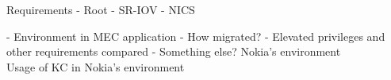 Requirements
- Root
- SR-IOV
- NICS

- Environment in MEC application
    - How migrated?
    - Elevated privileges and other requirements compared
    - Something else?
Nokia's environment \\
Usage of KC in Nokia's environment \\






